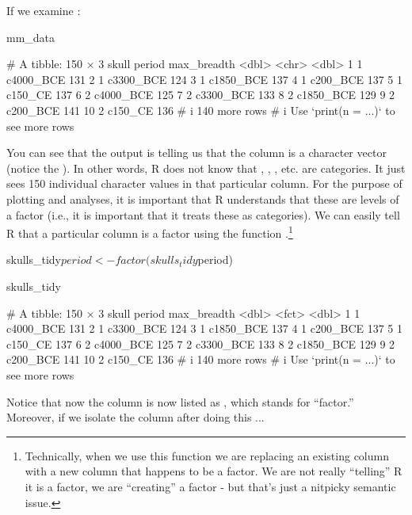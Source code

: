 If we examine :

\begin{inR}
mm_data
\end{inR}
\begin{outR}
# A tibble: 150 × 3
   skull period    max_breadth
   <dbl> <chr>           <dbl>
 1     1 c4000_BCE         131
 2     1 c3300_BCE         124
 3     1 c1850_BCE         137
 4     1 c200_BCE          137
 5     1 c150_CE           137
 6     2 c4000_BCE         125
 7     2 c3300_BCE         133
 8     2 c1850_BCE         129
 9     2 c200_BCE          141
10     2 c150_CE           136
# i 140 more rows
# i Use `print(n = ...)` to see more rows
\end{outR}

\noindent
You can see that the output is telling us that the  column is a character vector (notice the ). In other words, R does not know that , , , etc. are categories. It just sees 150 individual character values in that particular column. For the purpose of plotting and analyses, it is important that R understands that these are levels of a factor (i.e., it is important that it treats these as categories). We can easily tell R that a particular column is a factor using the function .\footnote{Technically, when we use this function we are replacing an existing column with a new column that happens to be a factor. We are not really ``telling'' R it is a factor, we are ``creating'' a factor - but that's just a nitpicky semantic issue.}

\begin{inR}
skulls_tidy$period <- factor(skulls_tidy$period)

skulls_tidy
\end{inR}
\begin{outR}
# A tibble: 150 × 3
   skull period    max_breadth
   <dbl> <fct>           <dbl>
 1     1 c4000_BCE         131
 2     1 c3300_BCE         124
 3     1 c1850_BCE         137
 4     1 c200_BCE          137
 5     1 c150_CE           137
 6     2 c4000_BCE         125
 7     2 c3300_BCE         133
 8     2 c1850_BCE         129
 9     2 c200_BCE          141
10     2 c150_CE           136
# i 140 more rows
# i Use `print(n = ...)` to see more rows
\end{outR}


\noindent
Notice that now the column  is now listed as , which stands for ``factor.''  Moreover, if we isolate the column after doing this ...

